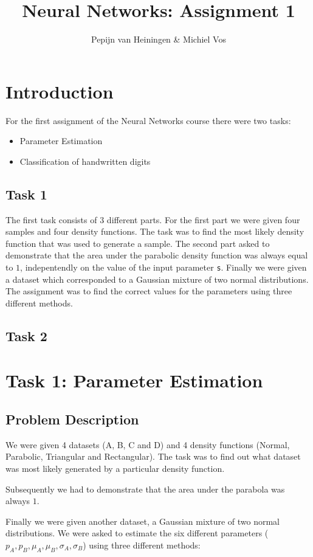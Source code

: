 \documentclass{article}
\title{Neural Networks: Assignment 1}
\author{Pepijn van Heiningen \& Michiel Vos}
\begin{document}
\maketitle

\section{Introduction}
For the first assignment of the Neural Networks course there were two tasks:
\begin{itemize}
\item Parameter Estimation
\item Classification of handwritten digits
\end{itemize}

\subsection{Task 1}
The first task consists of $3$ different parts. For the first part we were given four samples and four density functions. The task was to find the most likely density function that was used to generate a sample. 
The second part asked to demonstrate that the area under the parabolic density function was always equal to $1$, indepentendly on the value of the input parameter \verb+s+.
Finally we were given a dataset which corresponded to a Gaussian mixture of two normal distributions. The assignment was to find the correct values for the parameters using three different methods.

\subsection{Task 2}

\section{Task 1: Parameter Estimation}
\subsection{Problem Description}
We were given 4 datasets (A, B, C and D) and 4 density functions (Normal, Parabolic, Triangular and Rectangular). The task was to find out what dataset was most likely generated by a particular density function. 

Subsequently we had to demonstrate that the area under the parabola was always $1$.

Finally we were given another dataset, a Gaussian mixture of two normal distributions. We were asked to estimate the six different parameters ($p_A, p_B, \mu_A, \mu_B, \sigma_A, \sigma_B$) using three different methods:
\end{document}
